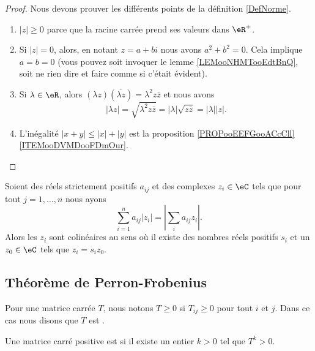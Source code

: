 \begin{proof}
	Nous devons prouver les différents points de la définition \ref{DefNorme}.
	\begin{enumerate}
		\item
		      \( | z |\geq 0\) parce que la racine carrée prend ses valeurs dans \( \eR^+\).
		\item
		      Si \( | z |=0\), alors, en notant \( z=a+bi\) nous avons \( a^2+b^2=0\). Cela implique \( a=b=0\) (vous pouvez soit invoquer le lemme \ref{LEMooNHMTooEdtBnQ}, soit ne rien dire et faire comme si c'était évident).
		\item
		      Si \( \lambda\in \eR\), alors \( (\lambda z)(\overline{ \lambda z })=\lambda^2z\bar z\) et nous avons
		      \begin{equation}
			      | \lambda z |=\sqrt{ \lambda^2z\bar z }=| \lambda |\sqrt{ z\bar z }=| \lambda | |z |.
		      \end{equation}
		\item
		      L'inégalité \( | x+y |\leq | x |+| y |\) est la proposition \ref{PROPooEEFGooACcCll}\ref{ITEMooDVMDooFDmOur}.
	\end{enumerate}
\end{proof}



\begin{lemma}       \label{LEMooNIXZooDxfpNM}
	Soient des réels strictement positifs \( a_{ij}\) et des complexes \( z_i\in \eC\) tels que pour tout \( j=1,\ldots, n\) nous ayons
	\begin{equation}
		\sum_{i=1}^na_{ij}| z_i |=| \sum_ia_{ij}z_i |.
	\end{equation}
	Alors les \( z_i\) sont colinéaires au sens où il existe des nombres réels positifs \( s_i\) et un \( z_0\in \eC\) tels que \( z_i=s_iz_0\).
\end{lemma}

\subsection{Théorème de Perron-Frobenius}

\begin{definition}
	Pour une matrice carrée \( T\), nous notons \( T\geq 0\) si \( T_{ij}\geq 0\) pour tout \( i\) et \( j\). Dans ce cas nous disons que \( T\) est .

	Une matrice carré positive est  si il existe un entier \( k>0\) tel que \( T^k>0\).
\end{definition}

